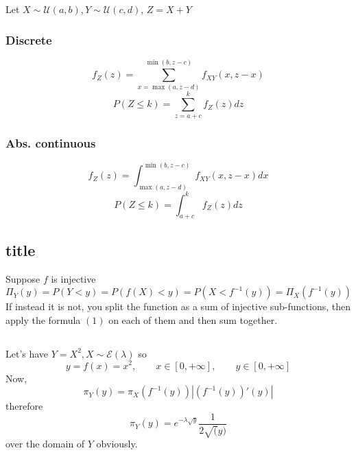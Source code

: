 \documentclass[12pt]{article}
\begin{document}
\subsection{}
Let $X\sim\mathcal{U}(a,b), Y\sim\mathcal{U}(c,d)$, $Z=X+Y$
\subsubsection{Discrete}
$$f_Z(z)=\sum_{x=\max(a,z-d)}^{\min(b,z-c)}f_{XY}(x,z-x)$$
$$P(Z\leq k)=\sum_{z=a+c}^kf_Z(z)dz$$
\subsubsection{Abs. continuous}
$$f_Z(z)=\int_{\max(a,z-d)}^{\min(b,z-c)}f_{XY}(x,z-x)dx$$
$$P(Z\leq k)=\int_{a+c}^kf_Z(z)dz$$
\subsection{title}
Suppose $f$ is injective
\begin{equation}
  \Pi_Y(y)=P(Y<y)=P(f(X)<y)=P(X<f^{-1}(y))=\Pi_X(f^{-1}(y))  
\end{equation}
If instead it is not, you split the function as a sum of injective sub-functions, then apply the formula $(1)$ on each of them and then sum together.
\subsection{}
Let's have $Y=X^2, X\sim \mathcal{E}(\lambda)$ so 
$$y=f(x)=x^2,\qquad x\in[0,+\infty],\qquad y\in[0,+\infty]$$
Now, $$\pi_Y(y)=\pi_X(f^{-1}(y))|(f^{-1}(y))'(y)|$$
therefore
$$\pi_Y(y) = e^{-\lambda \sqrt{y}}\frac{1}{2\sqrt(y)}$$
over the domain of $Y$ obviously.
\end{document}
